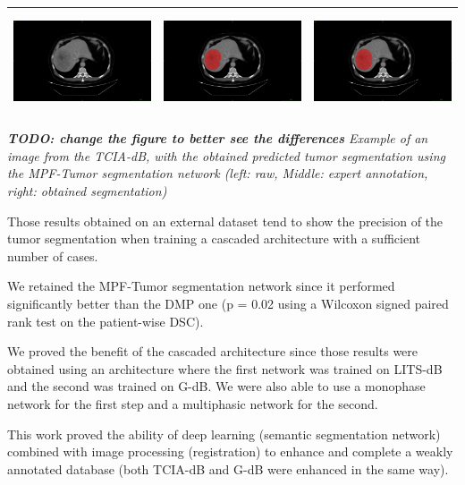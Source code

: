 \documentclass[]{article}
\begin{document}
\begin{longtable}[c]{@{}lll@{}}
\toprule
\includegraphics[width=1.94792in,height=1.15278in]{./images/media/image13.png}
&
\includegraphics[width=1.94792in,height=1.15278in]{./images/media/image10.png}
&
\includegraphics[width=1.94792in,height=1.15278in]{./images/media/image7.png}\tabularnewline
\midrule
\endhead
\bottomrule
\end{longtable}

\emph{\textbf{TODO: change the figure to better see the differences}
Example of an image from the TCIA-dB, with the obtained predicted tumor
segmentation using the MPF-Tumor segmentation network (left: raw,
Middle: expert annotation, right: obtained segmentation)}

Those results obtained on an external dataset tend to show the precision
of the tumor segmentation when training a cascaded architecture with a
sufficient number of cases.

We retained the MPF-Tumor segmentation network since it performed
significantly better than the DMP one (p = 0.02 using a Wilcoxon signed
paired rank test on the patient-wise DSC).

We proved the benefit of the cascaded architecture since those results
were obtained using an architecture where the first network was trained
on LITS-dB and the second was trained on G-dB. We were also able to use
a monophase network for the first step and a multiphasic network for the
second.

This work proved the ability of deep learning (semantic segmentation
network) combined with image processing (registration) to enhance and
complete a weakly annotated database (both TCIA-dB and G-dB were
enhanced in the same way).
\end{document}
